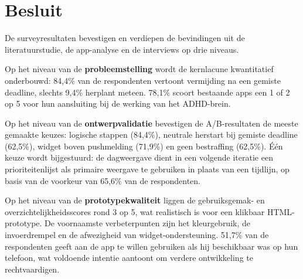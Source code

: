 \section{Besluit}

De surveyresultaten bevestigen en verdiepen de bevindingen uit de
literatuurstudie, de app-analyse en de interviews op drie niveaus.

Op het niveau van de \textbf{probleemstelling} wordt de kernlacune kwantitatief
onderbouwd: 84,4\% van de respondenten vertoont vermijding na een gemiste
deadline, slechts 9,4\% herplant meteen. 78,1\% scoort bestaande apps een 1
of 2 op 5 voor hun aansluiting bij de werking van het ADHD-brein.

Op het niveau van de \textbf{ontwerpvalidatie} bevestigen de A/B-resultaten de
meeste gemaakte keuzes: logische stappen (84,4\%), neutrale herstart bij gemiste
deadline (62,5\%), widget boven pushmelding (71,9\%) en geen bestraffing (62,5\%).
Één keuze wordt bijgestuurd: de dagweergave dient in een volgende iteratie een
prioriteitenlijst als primaire weergave te gebruiken in plaats van een tijdlijn,
op basis van de voorkeur van 65,6\% van de respondenten.

Op het niveau van de \textbf{prototypekwaliteit} liggen de gebruiksgemak- en
overzichtelijkheidsscores rond 3 op 5, wat realistisch is voor een klikbaar
HTML-prototype. De voornaamste verbeterpunten zijn het kleurgebruik, de
invoerdrempel en de afwezigheid van widget-ondersteuning. 51,7\% van de
respondenten geeft aan de app te willen gebruiken als hij beschikbaar was op
hun telefoon, wat voldoende intentie aantoont om verdere ontwikkeling te
rechtvaardigen.